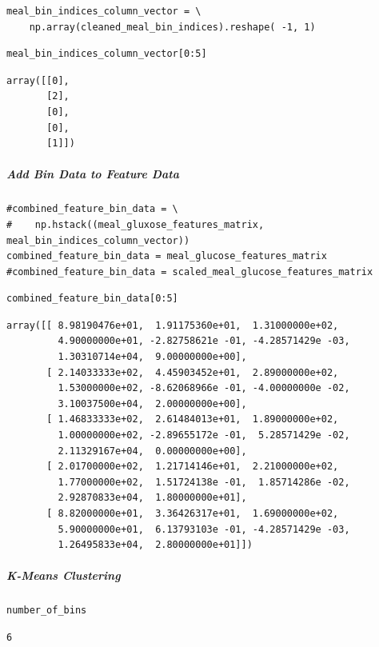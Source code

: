 \begin{verbatim}
meal_bin_indices_column_vector = \
    np.array(cleaned_meal_bin_indices).reshape( -1, 1)
\end{verbatim}

\begin{verbatim}
meal_bin_indices_column_vector[0:5]
\end{verbatim}

\begin{verbatim}
array([[0],
       [2],
       [0],
       [0],
       [1]])
\end{verbatim}

\subparagraph{Add Bin Data to Feature Data}

\begin{verbatim}
#combined_feature_bin_data = \
#    np.hstack((meal_gluxose_features_matrix, meal_bin_indices_column_vector))
combined_feature_bin_data = meal_glucose_features_matrix
#combined_feature_bin_data = scaled_meal_glucose_features_matrix
\end{verbatim}

\begin{verbatim}
combined_feature_bin_data[0:5]
\end{verbatim}

\begin{verbatim}
array([[ 8.98190476e+01,  1.91175360e+01,  1.31000000e+02,
         4.90000000e+01, -2.82758621e -01, -4.28571429e -03,
         1.30310714e+04,  9.00000000e+00],
       [ 2.14033333e+02,  4.45903452e+01,  2.89000000e+02,
         1.53000000e+02, -8.62068966e -01, -4.00000000e -02,
         3.10037500e+04,  2.00000000e+00],
       [ 1.46833333e+02,  2.61484013e+01,  1.89000000e+02,
         1.00000000e+02, -2.89655172e -01,  5.28571429e -02,
         2.11329167e+04,  0.00000000e+00],
       [ 2.01700000e+02,  1.21714146e+01,  2.21000000e+02,
         1.77000000e+02,  1.51724138e -01,  1.85714286e -02,
         2.92870833e+04,  1.80000000e+01],
       [ 8.82000000e+01,  3.36426317e+01,  1.69000000e+02,
         5.90000000e+01,  6.13793103e -01, -4.28571429e -03,
         1.26495833e+04,  2.80000000e+01]])
\end{verbatim}

\subparagraph{K-Means Clustering}

\begin{verbatim}
number_of_bins
\end{verbatim}

\begin{verbatim}
6
\end{verbatim}

